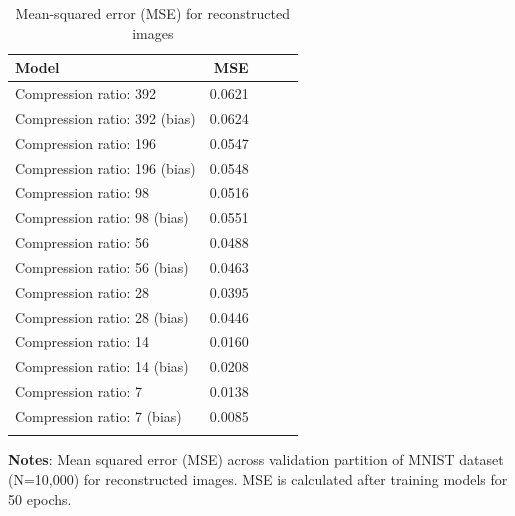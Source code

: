 \begin{table}[h]
	\caption{Mean-squared error (MSE) for reconstructed images \label{table:mse-final}}
	\centering
	\begin{tabular}{lrrrr}
		\toprule
			Model &  MSE  \\
		\midrule
			\addlinespace{}
			\parbox{12.5cm}{Compression ratio: 392} & 0.0621 \\
			\addlinespace{}
			Compression ratio: 392 (bias) 	& 0.0624 \\
			\addlinespace{}
			Compression ratio: 196 			& 0.0547 \\
			\addlinespace{}
			Compression ratio: 196 (bias) 	& 0.0548 \\
			\addlinespace{}
			Compression ratio: 98 			& 0.0516 \\
			\addlinespace{}
			Compression ratio: 98 (bias) 	& 0.0551 \\
			\addlinespace{}
			Compression ratio: 56 			& 0.0488 \\
			\addlinespace{}
			Compression ratio: 56 (bias)	& 0.0463 \\
			\addlinespace{}
			Compression ratio: 28 			& 0.0395 \\
			\addlinespace{}
			Compression ratio: 28 (bias) 	& 0.0446 \\
			\addlinespace{}
			Compression ratio: 14 			& 0.0160 \\
			\addlinespace{}
			Compression ratio: 14 (bias) 	& 0.0208 \\
			\addlinespace{}
			Compression ratio: 7 			& 0.0138 \\
			\addlinespace{}
			Compression ratio: 7 (bias) 	& 0.0085 \\
	\bottomrule
	\addlinespace[1em]
	\end{tabular}
	\parbox{14.5cm}{\textbf{Notes}: Mean squared error (MSE) across validation partition of MNIST dataset (N=10,000) for reconstructed images. MSE is calculated after training models for 50 epochs.}
\end{table}

